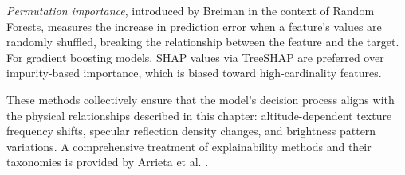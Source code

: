     \emph{Permutation importance}, introduced by Breiman \cite{Breiman2001} in the context of Random Forests, measures the increase in prediction error when a feature's values are randomly shuffled, breaking the relationship between the feature and the target. For gradient boosting models, SHAP values via TreeSHAP are preferred over impurity-based importance, which is biased toward high-cardinality features.

    These methods collectively ensure that the model's decision process aligns with the physical relationships described in this chapter: altitude-dependent texture frequency shifts, specular reflection density changes, and brightness pattern variations. A comprehensive treatment of explainability methods and their taxonomies is provided by Arrieta et al. \cite{XAISurvey2020}.